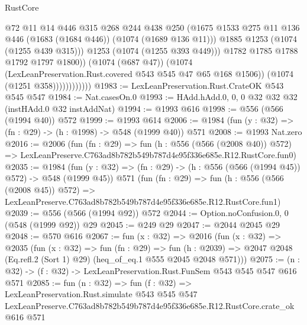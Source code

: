 \begin{lexlean}{RustCore}
\begin{coremodule}
                                @72
                                @11
                                @14
                                @446
                                @315
                                @268
                                @244
                                @438
                                @250
                                (@1675
                                  @1533
                                  @275
                                  @11
                                  @136
                                  @446
                                  (@1683 (@1684 @446))
                                  (@1074 (@1689 @136 @11)))
                                @1885
                                @1253
                                (@1074 (@1255 @439 @315)))
                              @1253
                              (@1074 (@1255 @393 @449)))
                            @1782
                            @1785
                            @1788
                            @1792
                            @1797
                            @1800))
                        (@1074 (@687 @47))
                        (@1074 (LexLeanPreservation.Rust.covered @543 @545 @47 @65 @168 @1506))
                        (@1074 (@1251 @358))))))))))))
@1983 := LexLeanPreservation.Rust.CrateOK @543 @545 @547
@1984 := Nat.casesOn.{0}
@1993 := HAdd.hAdd.{0, 0, 0} @32 @32 @32 (instHAdd.{0} @32 instAddNat)
@1994 := @1993 @616
@1998 := @556 (@566 (@1994 @40)) @572
@1999 := @1993 @614
@2006 := @1984 (fun (y : @32) => (fn : @29) -> (h : @1998) -> @548 (@1999 @40)) @571
@2008 := @1993 Nat.zero
@2016 := @2006
    (fun (fn : @29) =>
    fun (h : @556 (@566 (@2008 @40)) @572) =>
    LexLeanPreserve.C763ad8b782b549b787d4e95f336e685e.R12.RustCore.fun0)
@2035 := @1984
    (fun (y : @32) => (fn : @29) -> (h : @556 (@566 (@1994 @45)) @572) -> @548 (@1999 @45))
    @571
    (fun (fn : @29) =>
    fun (h : @556 (@566 (@2008 @45)) @572) =>
    LexLeanPreserve.C763ad8b782b549b787d4e95f336e685e.R12.RustCore.fun1)
@2039 := @556 (@566 (@1994 @92)) @572
@2044 := Option.noConfusion.{0, 0} (@548 (@1999 @92)) @29
@2045 := @249 @29
@2047 := @2044 @2045 @29
@2048 := @570 @616
@2067 := fun (x : @32) =>
  @2016
    (fun (x : @32) =>
    @2035
      (fun (x : @32) =>
      fun (fn : @29) =>
      fun (h : @2039) =>
      @2047 @2048 (Eq.refl.{2} (Sort 1) @29) (heq_of_eq.{1} @555 @2045 @2048 @571)))
@2075 := (n : @32) -> (f : @32) -> LexLeanPreservation.Rust.FunSem @543 @545 @547 @616 @571
@2085 := fun (n : @32) =>
  fun (f : @32) =>
  LexLeanPreservation.Rust.simulate
    @543
    @545
    @547
    LexLeanPreserve.C763ad8b782b549b787d4e95f336e685e.R12.RustCore.crate_ok
    @616
    @571
\end{coremodule}
\end{lexlean}
